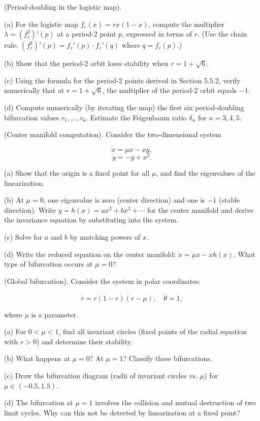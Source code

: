 \begin{exercise}
(Period-doubling in the logistic map).

(a) For the logistic map $f_r(x) = rx(1-x)$, compute the multiplier $\lambda = (f_r^2)'(p)$ at a period-2 point $p$, expressed in terms of $r$. (Use the chain rule: $(f_r^2)'(p) = f_r'(p) \cdot f_r'(q)$ where $q = f_r(p)$.)

(b) Show that the period-2 orbit loses stability when $r = 1 + \sqrt{6}$.

(c) Using the formula for the period-2 points derived in Section 5.5.2, verify numerically that at $r = 1 + \sqrt{6}$, the multiplier of the period-2 orbit equals $-1$.

(d) Compute numerically (by iterating the map) the first six period-doubling bifurcation values $r_1, \ldots, r_6$. Estimate the Feigenbaum ratio $\delta_n$ for $n = 3, 4, 5$.


\bigskip

\end{exercise}


\begin{exercise}
(Center manifold computation). Consider the two-dimensional system

\[
\dot{x} = \mu x - xy,
\]
\[
\dot{y} = -y + x^2.
\]

(a) Show that the origin is a fixed point for all $\mu$, and find the eigenvalues of the linearization.

(b) At $\mu = 0$, one eigenvalue is zero (center direction) and one is $-1$ (stable direction). Write $y = h(x) = ax^2 + bx^3 + \cdots$ for the center manifold and derive the invariance equation by substituting into the system.

(c) Solve for $a$ and $b$ by matching powers of $x$.

(d) Write the reduced equation on the center manifold: $\dot{x} = \mu x - x h(x)$. What type of bifurcation occurs at $\mu = 0$?


\bigskip

\end{exercise}


\begin{exercise}
(Global bifurcation). Consider the system in polar coordinates:

\[
\dot{r} = r(1 - r)(r - \mu), \quad \dot{\theta} = 1,
\]

where $\mu$ is a parameter.

(a) For $0 < \mu < 1$, find all invariant circles (fixed points of the radial equation with $r > 0$) and determine their stability.

(b) What happens at $\mu = 0$? At $\mu = 1$? Classify these bifurcations.

(c) Draw the bifurcation diagram (radii of invariant circles vs. $\mu$) for $\mu \in (-0.5, 1.5)$.

(d) The bifurcation at $\mu = 1$ involves the collision and mutual destruction of two limit cycles. Why can this not be detected by linearization at a fixed point?


\bigskip

\end{exercise}


